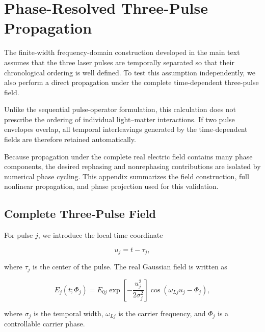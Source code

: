 \documentclass[11pt]{article}
\begin{document}
\appendix
\section{Phase-Resolved Three-Pulse Propagation}
\label{app:phase_resolved_propagation}

The finite-width frequency-domain construction developed in the main
text assumes that the three laser pulses are temporally separated so
that their chronological ordering is well defined.  To test this
assumption independently, we also perform a direct propagation under
the complete time-dependent three-pulse field.

Unlike the sequential pulse-operator formulation, this calculation
does not prescribe the ordering of individual light--matter
interactions.  If two pulse envelopes overlap, all temporal
interleavings generated by the time-dependent fields are therefore
retained automatically.

Because propagation under the complete real electric field contains
many phase components, the desired rephasing and nonrephasing
contributions are isolated by numerical phase cycling.  This appendix
summarizes the field construction, full nonlinear propagation, and
phase projection used for this validation.


\subsection{Complete Three-Pulse Field}
\label{app:three_pulse_field}

For pulse $j$, we introduce the local time coordinate

\begin{equation}
u_j
=
t-\tau_j,
\end{equation}

where $\tau_j$ is the center of the pulse.  The real Gaussian field is
written as

\begin{equation}
E_j(t;\Phi_j)
=
E_{0j}
\exp
\left[
-\frac{u_j^2}{2\sigma_j^2}
\right]
\cos
\left(
\omega_{Lj}u_j-\Phi_j
\right),
\label{eq:app_real_gaussian_field}
\end{equation}

where $\sigma_j$ is the temporal width, $\omega_{Lj}$ is the carrier
frequency, and $\Phi_j$ is a controllable carrier phase.
\end{document}
